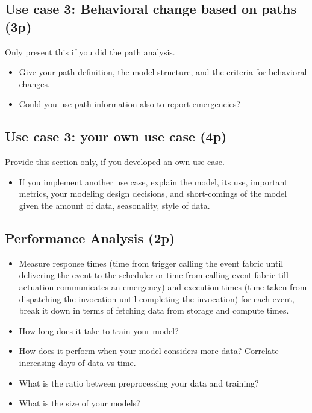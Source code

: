 \documentclass[A4,10pt]{article}
\begin{document}
\subsection{ Use case 3: Behavioral change based on paths (3p)}

Only present this if you did the path analysis.

\begin{itemize}
	\item Give your path definition, the model structure, and the criteria for behavioral changes.
	\item Could you use path information also to report emergencies?
\end{itemize}


\subsection{ Use case 3: your own use case (4p)}

Provide this section only, if you developed an own use case.

\begin{itemize}
	\item If you implement another use case, explain the model, its use, important metrics, your modeling design decisions, and short-comings of the model given the amount of data, seasonality, style of data.
\end{itemize}


\subsection{ Performance Analysis (2p)}

\begin{itemize}
	\item Measure response times (time from trigger calling the event fabric until delivering the event to the scheduler or time from calling event fabric till actuation communicates an emergency) and execution times (time taken from dispatching the invocation until completing the invocation) for each event, break it down in terms of fetching data from storage and compute times.
	\item How long does it take to train your model?
	\item How does it perform when your model considers more data? Correlate increasing days of data vs time.
	\item What is the ratio between preprocessing your data and training? 
	\item What is the size of your models?
\end{itemize}
\end{document}
